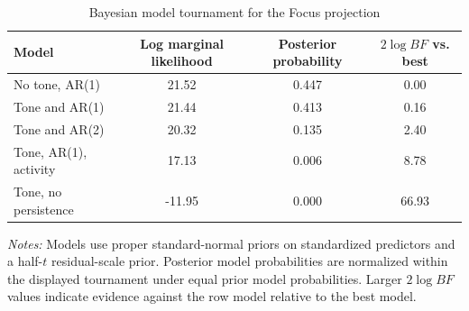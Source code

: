 \begin{table}[htbp]
\color{revisionred}
\centering
\begin{threeparttable}
\caption{Bayesian model tournament for the Focus projection}
\label{tab:tournament-focus}
\begin{scriptsize}
\setlength{\tabcolsep}{4.2pt}
\begin{tabular}{lccc}
\toprule
Model & Log marginal likelihood & Posterior probability & $2\log BF$ vs. best \\
\midrule
No tone, AR(1) & 21.52 & 0.447 & 0.00 \\
Tone and AR(1) & 21.44 & 0.413 & 0.16 \\
Tone and AR(2) & 20.32 & 0.135 & 2.40 \\
Tone, AR(1), activity & 17.13 & 0.006 & 8.78 \\
Tone, no persistence & -11.95 & 0.000 & 66.93 \\
\bottomrule
\end{tabular}
\begin{tablenotes}[flushleft]
\scriptsize
\item \textit{Notes:} Models use proper standard-normal priors on standardized predictors and a half-$t$ residual-scale prior. Posterior model probabilities are normalized within the displayed tournament under equal prior model probabilities. Larger $2\log BF$ values indicate evidence against the row model relative to the best model.
\end{tablenotes}
\end{scriptsize}
\end{threeparttable}
\end{table}
